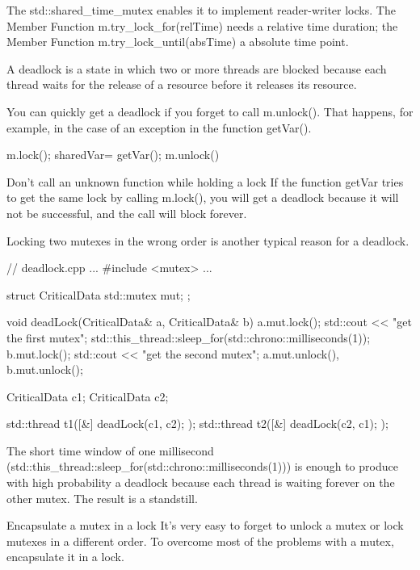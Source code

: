 The std::shared\_time\_mutex enables it to implement reader-writer locks. The Member Function m.try\_lock\_for(relTime) needs a relative time duration; the Member Function m.try\_lock\_until(absTime) a absolute time point.



A deadlock is a state in which two or more threads are blocked because each thread waits for the release of a resource before it releases its resource.

You can quickly get a deadlock if you forget to call m.unlock(). That happens, for example, in the case of an exception in the function getVar().

\begin{cpp}
m.lock();
sharedVar= getVar();
m.unlock()
\end{cpp}

\begin{myWarning}{Don’t call an unknown function while holding a lock}
If the function getVar tries to get the same lock by calling m.lock(), you will get a deadlock because it will not be successful, and the call will block forever.
\end{myWarning}

Locking two mutexes in the wrong order is another typical reason for a deadlock.


\begin{cpp}
// deadlock.cpp
...
#include <mutex>
...

struct CriticalData{
	std::mutex mut;
};

void deadLock(CriticalData& a, CriticalData& b){
	a.mut.lock();
	std::cout << "get the first mutex\n";
	std::this_thread::sleep_for(std::chrono::milliseconds(1));
	b.mut.lock();
	std::cout << "get the second mutex\n";
	a.mut.unlock(), b.mut.unlock();
}

CriticalData c1;
CriticalData c2;

std::thread t1([&]{ deadLock(c1, c2); });
std::thread t2([&]{ deadLock(c2, c1); });
\end{cpp}

The short time window of one millisecond (std::this\_thread::sleep\_for(std::chrono::milliseconds(1))) is enough to produce with high probability a deadlock because each thread is waiting forever on the other mutex. The result is a standstill.


\begin{myTip}{Encapsulate a mutex in a lock}
It’s very easy to forget to unlock a mutex or lock mutexes in a different order. To overcome most of the problems with a mutex, encapsulate it in a lock.
\end{myTip}


